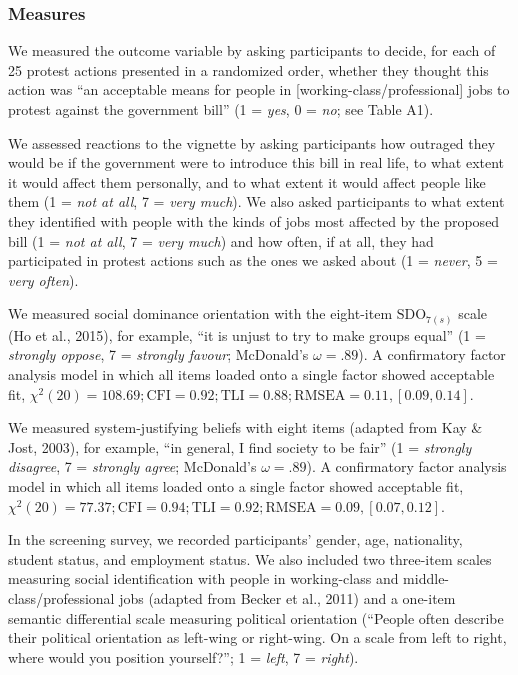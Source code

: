 \documentclass[12pt, letterpaper]{article}
\begin{document}
\hypertarget{measures}{%
\subsubsection{Measures}\label{measures}}

We measured the outcome variable by asking participants to decide, for
each of 25 protest actions presented in a randomized order, whether they
thought this action was ``an acceptable means for people in
{[}working-class/professional{]} jobs to protest against the government
bill'' (1 = \emph{yes}, 0 = \emph{no}; see Table A1).

We assessed reactions to the vignette by asking participants how
outraged they would be if the government were to introduce this bill in
real life, to what extent it would affect them personally, and to what
extent it would affect people like them (1 = \emph{not at all}, 7 =
\emph{very much}). We also asked participants to what extent they
identified with people with the kinds of jobs most affected by the
proposed bill (1 = \emph{not at all}, 7 = \emph{very much}) and how
often, if at all, they had participated in protest actions such as the
ones we asked about (1 = \emph{never}, 5 = \emph{very often}).

We measured social dominance orientation with the eight-item
\(\text{SDO}_{7(s)}\) scale (Ho et al., 2015), for example, ``it is
unjust to try to make groups equal'' (1 = \emph{strongly oppose}, 7 =
\emph{strongly favour}; McDonald's \(\omega = .89\)). A confirmatory
factor analysis model in which all items loaded onto a single factor
showed acceptable fit,
\(\chi^2 (20) = 108.69; \text{CFI} = 0.92; \text{TLI} = 0.88; \text{RMSEA} = 0.11, [0.09, 0.14]\).

We measured system-justifying beliefs with eight items (adapted from Kay
\& Jost, 2003), for example, ``in general, I find society to be fair''
(1 = \emph{strongly disagree}, 7 = \emph{strongly agree}; McDonald's
\(\omega = .89\)). A confirmatory factor analysis model in which all
items loaded onto a single factor showed acceptable fit,
\(\chi^2 (20) = 77.37; \text{CFI} = 0.94; \text{TLI} = 0.92; \text{RMSEA} = 0.09, [0.07, 0.12]\).

In the screening survey, we recorded participants' gender, age,
nationality, student status, and employment status. We also included two
three-item scales measuring social identification with people in
working-class and middle-class/professional jobs (adapted from Becker et
al., 2011) and a one-item semantic differential scale measuring
political orientation (``People often describe their political
orientation as left-wing or right-wing. On a scale from left to right,
where would you position yourself?''; 1 = \emph{left}, 7 =
\emph{right}).
\end{document}
